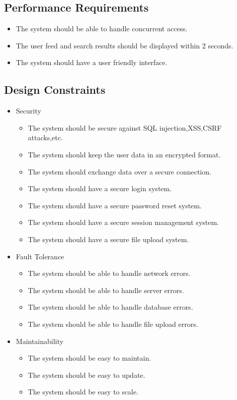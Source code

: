 \documentclass[conference,compsoc]{IEEEtran}
\begin{document}
\subsection{Performance Requirements}
\begin{itemize}
    \item The system should be able to handle concurrent access.
    \item The user feed and search results should be displayed within 2 seconds.
    \item The system should have a user friendly interface.
\end{itemize}
\subsection{Design Constraints}
\begin{itemize}
    \item Security
          \begin{itemize}
              \item The system should be secure against SQL injection,XSS,CSRF attacks,etc.
              \item The system should keep the user data in an encrypted format.
              \item The system should exchange data over a secure connection.
              \item The system should have a secure login system.
              \item The system should have a secure password reset system.
              \item The system should have a secure session management system.
              \item The system should have a secure file upload system.
          \end{itemize}
    \item Fault Tolerance
          \begin{itemize}
              \item The system should be able to handle network errors.
              \item The system should be able to handle server errors.
              \item The system should be able to handle database errors.
              \item The system should be able to handle file upload errors.
          \end{itemize}
    \item Maintainability
          \begin{itemize}
              \item The system should be easy to maintain.
              \item The system should be easy to update.
              \item The system should be easy to scale.
          \end{itemize}
\end{itemize}
\end{document}
